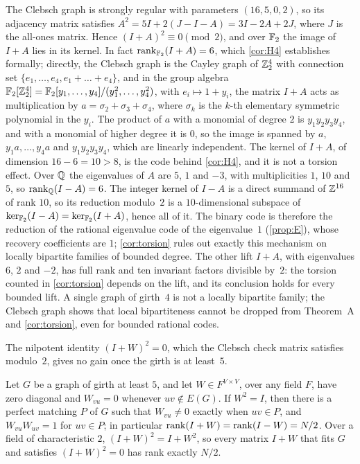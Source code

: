 \begin{remark}\label{rem:ana-clebsch}
The Clebsch graph is strongly regular with parameters $(16,5,0,2)$, so its adjacency matrix satisfies
$A^2=5I+2(J-I-A)=3I-2A+2J$, where $J$ is the all-ones matrix. Hence $(I+A)^2\equiv0\pmod 2$, and over $\mathbb{F}_2$ the image
of $I+A$ lies in its kernel. In fact $\operatorname{rank}_{\mathbb{F}_2}(I+A)=6$, which \cref{cor:H4} establishes formally; directly, the Clebsch graph is the Cayley
graph of
$\mathbb{Z}_2^4$ with connection set $\{e_1,\dots,e_4,e_1+\dots+e_4\}$, and in the group algebra
$\mathbb{F}_2[\mathbb{Z}_2^4]=\mathbb{F}_2[y_1,\dots,y_4]/(y_1^2,\dots,y_4^2)$, with $e_i\mapsto1+y_i$, the matrix $I+A$ acts as multiplication
by $a=\sigma_2+\sigma_3+\sigma_4$, where $\sigma_k$ is the $k$-th elementary symmetric polynomial in the $y_i$. The
product of $a$ with a monomial of degree $2$ is $y_1y_2y_3y_4$, and with a monomial of higher degree it is $0$, so the
image is spanned by $a$, $y_1a,\dots,y_4a$ and $y_1y_2y_3y_4$, which are linearly independent. The kernel of $I+A$, of
dimension $16-6=10>8$, is the code behind \cref{cor:H4}, and it is not a torsion effect. Over $\mathbb{Q}$ the eigenvalues of $A$ are $5$, $1$
and $-3$, with multiplicities $1$, $10$ and $5$, so $\operatorname{rank}_{\mathbb{Q}}(I-A)=6$. The integer kernel of $I-A$ is a direct summand
of $\mathbb{Z}^{16}$ of rank $10$, so its reduction modulo~$2$ is a $10$-dimensional subspace of $\ker_{\mathbb{F}_2}(I-A)=\ker_{\mathbb{F}_2}(I+A)$,
hence all of it. The binary code is therefore the reduction of the rational eigenvalue code of the eigenvalue~$1$
(\cref{prop:E}), whose recovery coefficients are $1$; \cref{cor:torsion} rules out exactly this mechanism on locally
bipartite families of bounded degree. The other lift $I+A$, with eigenvalues $6$, $2$ and $-2$, has full rank and ten
invariant factors divisible by~$2$: the torsion counted in \cref{cor:torsion} depends on the lift, and its conclusion
holds for every bounded lift. A single graph of girth~$4$ is not a locally bipartite family; the Clebsch graph shows
that local bipartiteness cannot be dropped from Theorem~A and \cref{cor:torsion}, even for bounded rational codes.
\end{remark}

The nilpotent identity $(I+W)^2=0$, which the Clebsch check matrix satisfies modulo~$2$, gives no gain once the girth is
at least~$5$.

\begin{lemma}\label{lem:ana-matching}
\notformalized
Let $G$ be a graph of girth at least $5$, and let $W\in F^{V\times V}$, over any field $F$, have zero diagonal and
$W_{vu}=0$ whenever $uv\notin E(G)$. If $W^2=I$, then there is a perfect matching $P$ of $G$ such that $W_{vu}\ne0$
exactly when $uv\in P$, and $W_{vu}W_{uv}=1$ for $uv\in P$; in particular $\operatorname{rank}(I+W)=\operatorname{rank}(I-W)=N/2$. Over a field of
characteristic $2$, $(I+W)^2=I+W^2$, so every matrix $I+W$ that fits $G$ and satisfies $(I+W)^2=0$ has rank exactly
$N/2$.
\end{lemma}

